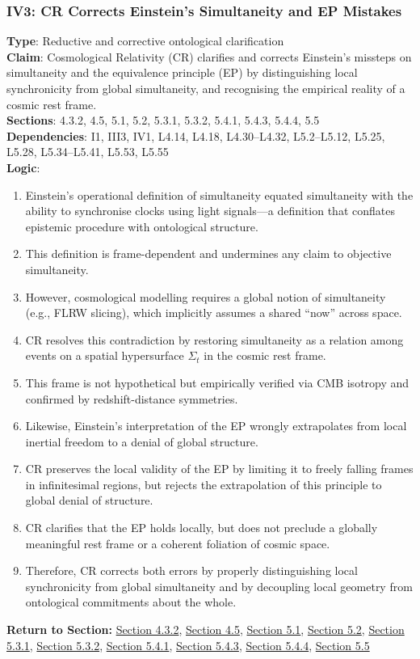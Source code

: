 \documentclass[12pt]{book}
\begin{document}
\subsubsection*{IV3: CR Corrects Einstein's Simultaneity and EP Mistakes}
\label{appendix:IV3}
\textbf{Type}: Reductive and corrective ontological clarification\\
\textbf{Claim}: Cosmological Relativity (CR) clarifies and corrects Einstein's missteps on simultaneity and the equivalence principle (EP) by distinguishing local synchronicity from global simultaneity, and recognising the empirical reality of a cosmic rest frame.\\
\textbf{Sections}: 4.3.2, 4.5, 5.1, 5.2, 5.3.1, 5.3.2, 5.4.1, 5.4.3, 5.4.4, 5.5\\
\textbf{Dependencies}: I1, III3, IV1, L4.14, L4.18, L4.30–L4.32, L5.2–L5.12, L5.25, L5.28, L5.34–L5.41, L5.53, L5.55\\
\textbf{Logic}:
\begin{enumerate}
    \item Einstein's operational definition of simultaneity equated simultaneity with the ability to synchronise clocks using light signals---a definition that conflates epistemic procedure with ontological structure.
    \item This definition is frame-dependent and undermines any claim to objective simultaneity.
    \item However, cosmological modelling requires a global notion of simultaneity (e.g., FLRW slicing), which implicitly assumes a shared ``now'' across space.
    \item CR resolves this contradiction by restoring simultaneity as a relation among events on a spatial hypersurface \(\Sigma_t\) in the cosmic rest frame.
    \item This frame is not hypothetical but empirically verified via CMB isotropy and confirmed by redshift-distance symmetries.
    \item Likewise, Einstein's interpretation of the EP wrongly extrapolates from local inertial freedom to a denial of global structure.
    \item CR preserves the local validity of the EP by limiting it to freely falling frames in infinitesimal regions, but rejects the extrapolation of this principle to global denial of structure.
    \item CR clarifies that the EP holds locally, but does not preclude a globally meaningful rest frame or a coherent foliation of cosmic space.
    \item Therefore, CR corrects both errors by properly distinguishing local synchronicity from global simultaneity and by decoupling local geometry from ontological commitments about the whole.
\end{enumerate}
\textbf{Return to Section:} \hyperref[sec:4.3.2]{Section 4.3.2}, \hyperref[sec:4.5]{Section 4.5}, \hyperref[sec:5.1]{Section 5.1}, \hyperref[sec:5.2]{Section 5.2}, \hyperref[sec:5.3.1]{Section 5.3.1}, \hyperref[sec:5.3.2]{Section 5.3.2}, \hyperref[sec:5.4.1]{Section 5.4.1}, \hyperref[sec:5.4.3]{Section 5.4.3}, \hyperref[sec:5.4.4]{Section 5.4.4}, \hyperref[sec:5.5]{Section 5.5}
\end{document}
